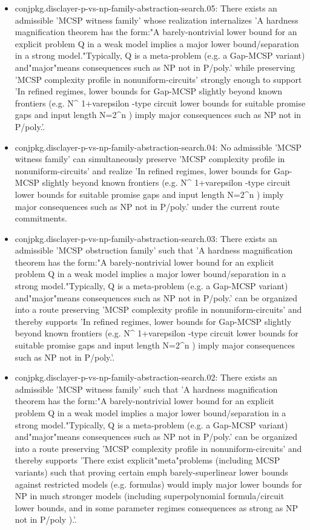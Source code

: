 \documentclass[11pt]{article}
\begin{document}
\begin{itemize}
\item conjpkg.disclayer-p-vs-np-family-abstraction-search.05: There exists an admissible 'MCSP witness family' whose realization internalizes 'A hardness magnification theorem has the form:"A barely-nontrivial lower bound for an explicit problem Q in a weak model implies a major lower bound/separation in a strong model."Typically, Q is a meta-problem (e.g. a Gap-MCSP variant) and"major"means consequences such as NP not in P/poly.' while preserving 'MCSP complexity profile in nonuniform-circuits' strongly enough to support 'In refined regimes, lower bounds for Gap-MCSP slightly beyond known frontiers (e.g. N\textasciicircum{} 1+varepsilon -type circuit lower bounds for suitable promise gaps and input length N=2\textasciicircum{}n ) imply major consequences such as NP not in P/poly.'.
\item conjpkg.disclayer-p-vs-np-family-abstraction-search.04: No admissible 'MCSP witness family' can simultaneously preserve 'MCSP complexity profile in nonuniform-circuits' and realize 'In refined regimes, lower bounds for Gap-MCSP slightly beyond known frontiers (e.g. N\textasciicircum{} 1+varepsilon -type circuit lower bounds for suitable promise gaps and input length N=2\textasciicircum{}n ) imply major consequences such as NP not in P/poly.' under the current route commitments.
\item conjpkg.disclayer-p-vs-np-family-abstraction-search.03: There exists an admissible 'MCSP obstruction family' such that 'A hardness magnification theorem has the form:"A barely-nontrivial lower bound for an explicit problem Q in a weak model implies a major lower bound/separation in a strong model."Typically, Q is a meta-problem (e.g. a Gap-MCSP variant) and"major"means consequences such as NP not in P/poly.' can be organized into a route preserving 'MCSP complexity profile in nonuniform-circuits' and thereby supports 'In refined regimes, lower bounds for Gap-MCSP slightly beyond known frontiers (e.g. N\textasciicircum{} 1+varepsilon -type circuit lower bounds for suitable promise gaps and input length N=2\textasciicircum{}n ) imply major consequences such as NP not in P/poly.'.
\item conjpkg.disclayer-p-vs-np-family-abstraction-search.02: There exists an admissible 'MCSP witness family' such that 'A hardness magnification theorem has the form:"A barely-nontrivial lower bound for an explicit problem Q in a weak model implies a major lower bound/separation in a strong model."Typically, Q is a meta-problem (e.g. a Gap-MCSP variant) and"major"means consequences such as NP not in P/poly.' can be organized into a route preserving 'MCSP complexity profile in nonuniform-circuits' and thereby supports 'There exist explicit"meta"problems (including MCSP variants) such that proving certain emph barely-superlinear lower bounds against restricted models (e.g. formulas) would imply major lower bounds for NP in much stronger models (including superpolynomial formula/circuit lower bounds, and in some parameter regimes consequences as strong as NP not in P/poly ).'.

\end{itemize}
\end{document}
